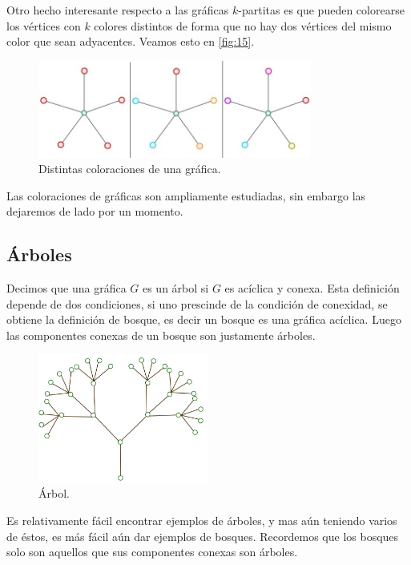 Otro hecho interesante respecto a las gráficas $k$-partitas es que pueden colorearse los vértices con $k$ colores distintos de forma que no hay dos vértices del mismo color que sean adyacentes. Veamos esto en \cref{fig:15}.

\begin{figure}[H]
  \centering
  \includegraphics[width=0.8\textwidth]{recursos/capturas/15.jpg}
  \caption{Distintas coloraciones de una gráfica.}
  \label{fig:13}
\end{figure}

Las coloraciones de gráficas son ampliamente estudiadas, sin embargo las dejaremos de lado por un momento.

\subsection{\'Arboles}
Decimos que una gráfica $G$ es un árbol si $G$ es acíclica y conexa.
Esta definición depende de dos condiciones, si uno prescinde de la condición de conexidad, se obtiene la definición de bosque, es decir un bosque es una gráfica acíclica. Luego las componentes conexas de un bosque son justamente árboles.

\begin{figure}[H]
  \centering
  \includegraphics[width=0.5\textwidth]{recursos/capturas/16.jpg}
  \caption{Árbol.}
  \label{fig:14}
\end{figure}

Es relativamente fácil encontrar ejemplos de árboles, y mas aún teniendo varios de éstos, es más fácil aún dar ejemplos de bosques. Recordemos que los bosques solo son aquellos que sus componentes conexas son árboles.

